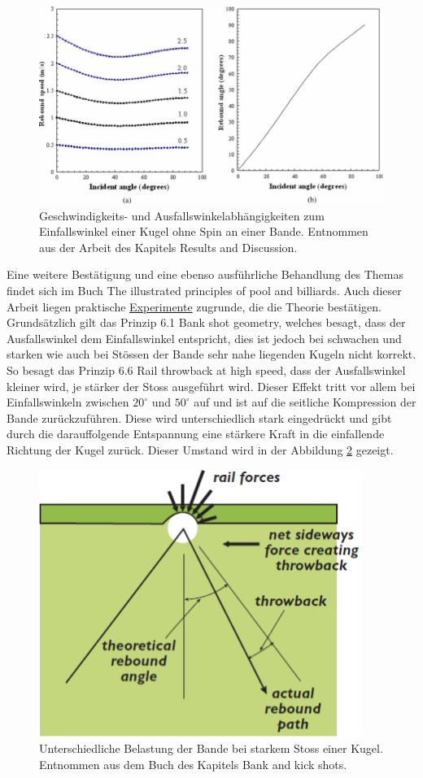 \begin{figure}[h!]
    \begin{center}
        \includegraphics[width=0.5\linewidth]{../common/03_billiard_ai/resources/55_rail_rebound_angle_no_spin.png}
    \end{center}
    \caption{Geschwindigkeits- und Ausfallswinkelabhängigkeiten zum Einfallswinkel einer Kugel ohne Spin an einer Bande.
    Entnommen aus der Arbeit \cite{10.1243/09544062JMES1964} des Kapitels \glqq Results and Discussion\grqq. }
    \label{fig:rail_rebound_angle_no_spin}
\end{figure}

Eine weitere Bestätigung und eine ebenso ausführliche Behandlung des Themas findet sich im Buch \glqq The illustrated principles
of pool and billiards\grqq. Auch dieser Arbeit liegen praktische
\href{https://billiards.colostate.edu/high-speed-video/}{Experimente} zugrunde, die die Theorie bestätigen.
Grundsätzlich gilt das Prinzip 6.1 \glqq Bank shot geometry\grqq, welches besagt, dass
der Ausfallswinkel dem Einfallswinkel entspricht, dies ist
jedoch bei schwachen und starken wie auch bei Stössen der Bande sehr nahe liegenden Kugeln nicht korrekt\cite{book:the_ilustrated_principles_of_pool_and_billiards}.
So besagt das Prinzip 6.6 \glqq Rail throwback at high speed\grqq, dass der Ausfallswinkel kleiner wird, je stärker der Stoss ausgeführt wird.
Dieser Effekt tritt vor allem bei Einfallswinkeln zwischen $20^{\circ}$ und $50^{\circ}$ auf und ist auf
die seitliche Kompression der Bande zurückzuführen. Diese wird unterschiedlich stark eingedrückt und gibt durch die
darauffolgende Entspannung eine stärkere Kraft in die einfallende Richtung der Kugel zurück\cite{book:the_ilustrated_principles_of_pool_and_billiards}.
Dieser Umstand wird in der Abbildung \ref{fig:rebound_angle_no_spin_fast_shot} gezeigt.

\begin{figure}[h!]
    \begin{center}
        \includegraphics[width=0.3\linewidth]{../common/03_billiard_ai/resources/56_rebound_angle_no_spin_fast_shot.png}
    \end{center}
    \caption{Unterschiedliche Belastung der Bande bei starkem Stoss einer Kugel.
    Entnommen aus dem Buch \cite{book:the_ilustrated_principles_of_pool_and_billiards} des Kapitels  Bank and kick shots\grqq.}
    \label{fig:rebound_angle_no_spin_fast_shot}
\end{figure}

